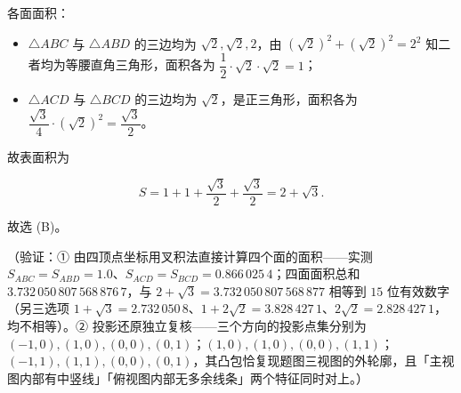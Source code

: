 \begin{answer}
各面面积：

\begin{itemize}
\item \(\triangle ABC\) 与 \(\triangle ABD\) 的三边均为 \(\sqrt{2},\sqrt{2},2\)，由 \((\sqrt{2})^{2}+(\sqrt{2})^{2}=2^{2}\) 知二者均为等腰直角三角形，面积各为 \(\dfrac{1}{2}\cdot\sqrt{2}\cdot\sqrt{2}=1\)；
\item \(\triangle ACD\) 与 \(\triangle BCD\) 的三边均为 \(\sqrt{2}\)，是正三角形，面积各为 \(\dfrac{\sqrt{3}}{4}\cdot(\sqrt{2})^{2}=\dfrac{\sqrt{3}}{2}\)。
\end{itemize}

故表面积为

\nopagebreak[4]
\[
S=1+1+\dfrac{\sqrt{3}}{2}+\dfrac{\sqrt{3}}{2}=2+\sqrt{3}.
\]

故选 (B)。

（验证：① 由四顶点坐标用叉积法直接计算四个面的面积——实测 \(S_{ABC}=S_{ABD}=1.0\)、\(S_{ACD}=S_{BCD}=0.866\,025\,4\)；四面面积总和 \(3.732\,050\,807\,568\,876\,7\)，与 \(2+\sqrt{3}=3.732\,050\,807\,568\,877\) 相等到 \(15\) 位有效数字（另三选项 \(1+\sqrt{3}=2.732\,050\,8\)、\(1+2\sqrt{2}=3.828\,427\,1\)、\(2\sqrt{2}=2.828\,427\,1\)，均不相等）。② 投影还原独立复核——三个方向的投影点集分别为 \((-1,0),(1,0),(0,0),(0,1)\)；\((1,0),(1,0),(0,0),(1,1)\)；\((-1,1),(1,1),(0,0),(0,1)\)，其凸包恰复现题图三视图的外轮廓，且「主视图内部有中竖线」「俯视图内部无多余线条」两个特征同时对上。）


\end{answer}
